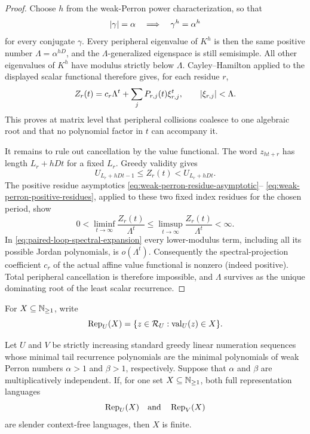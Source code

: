 \begin{proof}
  Choose \(h\) from the weak-Perron power characterization, so that
  \[
    \lvert \gamma \rvert=\alpha\quad\Longrightarrow\quad
    \gamma^h=\alpha^h
  \]
  for every conjugate \(\gamma\). Every peripheral eigenvalue of \(K^h\) is then
  the same positive number
  \(
    \Lambda=\alpha^{hD}
  \), and the \(\Lambda\)-generalized eigenspace is still semisimple.
  All other eigenvalues of \(K^h\) have modulus strictly below
  \(\Lambda\). Cayley--Hamilton applied to the displayed scalar functional
  therefore gives, for each residue \(r\),
  \begin{equation}
    Z_r(t)=c_r\Lambda^t+
      \sum_j P_{r,j}(t)\xi_{r,j}^t,
    \qquad \lvert \xi_{r,j} \rvert<\Lambda.
    \label{eq:paired-loop-spectral-expansion}
  \end{equation}
  This proves at matrix level that peripheral collisions coalesce to one
  algebraic root and that no polynomial factor in \(t\) can accompany it.

  It remains to rule out cancellation by the value functional. The
  word \(z_{ht+r}\) has length \(L_r+hDt\) for a fixed \(L_r\). Greedy
  validity gives
  \[
    U_{L_r+hDt-1}\le Z_r(t)<U_{L_r+hDt}.
  \]
  The positive residue asymptotics
  \eqref{eq:weak-perron-residue-asymptotic}--
  \eqref{eq:weak-perron-positive-residues}, applied to these two fixed
  index residues for the chosen period, show
  \[
    0<\liminf_{t\to\infty}\frac{Z_r(t)}{\Lambda^t}
      \le
      \limsup_{t\to\infty}\frac{Z_r(t)}{\Lambda^t}<\infty.
  \]
  In \eqref{eq:paired-loop-spectral-expansion} every lower-modulus term,
  including all its possible Jordan polynomials, is \(o(\Lambda^t)\).
  Consequently the spectral-projection coefficient \(c_r\) of the actual
  affine value functional is nonzero (indeed positive). Total peripheral
  cancellation is therefore impossible, and \(\Lambda\) survives as the
  unique dominating root of the least scalar recurrence.
\end{proof}

For \(X\subseteq\mathbb{N}_{\ge1}\), write
\[
  \operatorname{Rep}_U(X)
    =\{z\in\mathcal R_U:\operatorname{val}_U(z)\in X\}.
\]

\begin{theorem}
  \label{thm:slender-cfl-cobham}
  Let \(U\) and \(V\) be strictly increasing standard greedy linear
  numeration sequences whose minimal tail recurrence polynomials are the
  minimal polynomials of weak Perron numbers \(\alpha>1\) and \(\beta>1\),
  respectively. Suppose that \(\alpha\) and \(\beta\) are multiplicatively
  independent. If, for one set \(X\subseteq\mathbb{N}_{\ge1}\), both full
  representation languages
  \[
    \operatorname{Rep}_U(X)
    \quad\hbox{and}\quad
    \operatorname{Rep}_V(X)
  \]
  are slender context-free languages, then \(X\) is finite.
\end{theorem}

